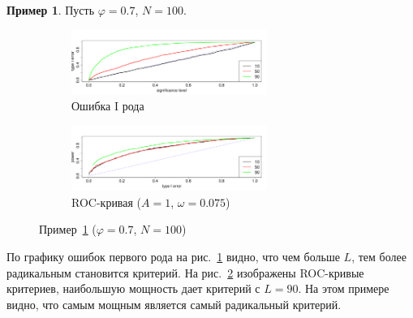 \documentclass[specialist,
substylefile = spbu.rtx,
               subf,href,colorlinks=true, 12pt]{disser}
\theoremstyle{definition}
\newtheorem{example}{Пример}
\begin{document}
\begin{example}\label{example1}
	Пусть $\varphi=0.7$, $N=100$.
	\begin{figure}[h!]
		\captionsetup[subfigure]{justification=Centering}
		\begin{subfigure}[t]{\textwidth}
			\centering
			\includegraphics[width=0.7\textwidth]{img/alphaI_phi7_N100}
			\caption{Ошибка I рода}
			\label{alphaI_phi7_N100}
		\end{subfigure}
		\begin{subfigure}[t]{\textwidth}
			\centering
			\includegraphics[width=0.7\textwidth]{img//roc_phi7_N100}
			\caption{ROC-кривая ($A=1$, $\omega=0.075$)}
			\label{roc_phi7_N100}
		\end{subfigure}
	\label{fig:example1}
	\caption{Пример~\ref{example1} ($\varphi=0.7$, $N=100$)}
	\end{figure}
	По графику ошибок первого рода на рис.~\ref{alphaI_phi7_N100} видно, что чем больше $L$, тем более радикальным становится критерий. На рис.~\ref{roc_phi7_N100} изображены ROC-кривые критериев, наибольшую мощность дает критерий с $L=90$. На этом примере видно, что самым мощным является самый радикальный критерий.
\end{example}
\end{document}
